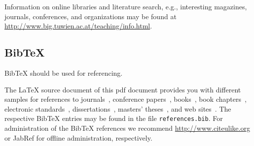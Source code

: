 \documentclass{llncs}
\begin{document}
Information on online libraries and literature search, e.g., interesting magazines, journals, conferences, and organizations may be found at \url{http://www.big.tuwien.ac.at/teaching/info.html}.

\subsection{BibTeX}

BibTeX should be used for referencing.

The LaTeX source document of this pdf document provides you with different samples for references to journals~\cite{jour:B2BServices}, conference papers~\cite{proc:TheWebMLApproach}, books~\cite{book:umlatwork}, book chapters~\cite{incoll:ErhardKonrad1992}, electronic standards~\cite{man:BPEL}, dissertations~\cite{phdthesis:manuelWimmer}, masters' theses~\cite{mast:AUMLProfile}, and web sites~\cite{misc:BIGWebsite}. The respective BibTeX entries may be found in the file \texttt{references.bib}. For administration of the BibTeX references we recommend \url{http://www.citeulike.org} or JabRef for offline administration, respectively.



\end{document}
